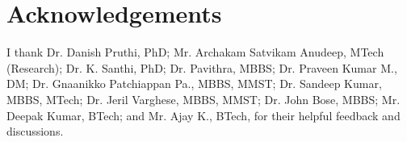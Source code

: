 \section*{Acknowledgements}
I thank Dr. Danish Pruthi, PhD; Mr. Archakam Satvikam Anudeep, MTech (Research); Dr. K. Santhi, PhD; Dr. Pavithra, MBBS; Dr. Praveen Kumar M., DM; Dr. Gnaanikko Patchiappan Pa., MBBS, MMST; Dr. Sandeep Kumar, MBBS, MTech; Dr. Jeril Varghese, MBBS, MMST; Dr. John Bose, MBBS; Mr. Deepak Kumar, BTech; and Mr. Ajay K., BTech, for their helpful feedback and discussions.